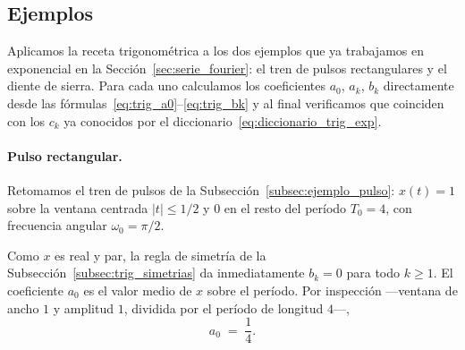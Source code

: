 \documentclass[class=book, crop=false]{standalone}
\begin{document}
\subsection{Ejemplos}
\label{subsec:ejemplos_trig}

Aplicamos la receta trigonométrica a los dos ejemplos que ya
trabajamos en exponencial en la Sección~\ref{sec:serie_fourier}: el
tren de pulsos rectangulares y el diente de sierra. Para cada uno
calculamos los coeficientes $a_0$, $a_k$, $b_k$ directamente desde
las fórmulas~\eqref{eq:trig_a0}--\eqref{eq:trig_bk} y al final
verificamos que coinciden con los $c_k$ ya conocidos por el
diccionario~\eqref{eq:diccionario_trig_exp}.

\paragraph{Pulso rectangular.}
Retomamos el tren de pulsos de la
Subsección~\ref{subsec:ejemplo_pulso}: $x(t) = 1$ sobre la ventana
centrada $|t|\leq 1/2$ y $0$ en el resto del período $T_0 = 4$, con
frecuencia angular $\omega_0 = \pi/2$.

Como $x$ es real y par, la regla de simetría de la
Subsección~\ref{subsec:trig_simetrias} da inmediatamente
$b_k = 0$ para todo $k\geq 1$. El coeficiente $a_0$ es el valor
medio de $x$ sobre el período. Por inspección ---ventana de ancho
$1$ y amplitud $1$, dividida por el período de longitud $4$---,
\begin{equation*}
    a_0 \;=\; \frac{1}{4}.
\end{equation*}
\end{document}
